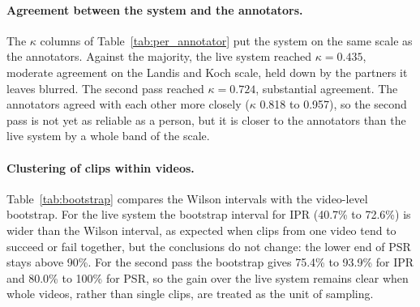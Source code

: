 \paragraph{Agreement between the system and the annotators.}
The $\kappa$ columns of Table~\ref{tab:per_annotator} put the system on the same scale as
the annotators. Against the majority, the live system reached $\kappa = 0.435$, moderate
agreement on the Landis and Koch scale, held down by the partners it leaves blurred. The
second pass reached $\kappa = 0.724$, substantial agreement. The annotators agreed with
each other more closely ($\kappa$ 0.818 to 0.957), so the second pass is not yet as
reliable as a person, but it is closer to the annotators than the live system by a whole
band of the scale.

\paragraph{Clustering of clips within videos.}
Table~\ref{tab:bootstrap} compares the Wilson intervals with the video-level bootstrap.
For the live system the bootstrap interval for IPR (40.7\% to 72.6\%) is wider than the
Wilson interval, as expected when clips from one video tend to succeed or fail together,
but the conclusions do not change: the lower end of PSR stays above 90\%. For the second
pass the bootstrap gives 75.4\% to 93.9\% for IPR and 80.0\% to 100\% for PSR, so the gain
over the live system remains clear when whole videos, rather than single clips, are
treated as the unit of sampling.

\begin{table}[htbp]
\begin{singlespace}
\centering
\caption{95\% intervals on Set~C: Wilson intervals, which treat clips as independent,
and video-level bootstrap intervals (5,000 resamples of the 21 videos). The Wilson
interval is not defined for F$_1$.}
\label{tab:bootstrap}
\renewcommand{\arraystretch}{1.3}
\end{singlespace}
\end{table}

